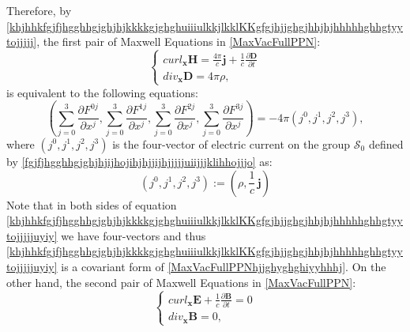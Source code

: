 \documentclass{article}
\theoremstyle{definition}
\theoremstyle{remark}
\renewcommand{\vec}[1]{\mathbf{#1}}
\newcommand{\er}{\eqref}
\newcommand{\er}{\eqref}
\begin{document}
Therefore, by
\er{khjhhkfgjfjhgghhgjghjhjkkkkgjghghuiiiulkkjlkklKKgfgjhjjghgjhhjhjhhhhhghhgtyytojjjjj},
the first pair of Maxwell Equations in \er{MaxVacFullPPN}:
\begin{equation}\label{MaxVacFullPPNhjjghyghghiyyhhhj}
\begin{cases}
curl_{\vec x} \vec H=\frac{4\pi}{c}\vec j+\frac{1}{c}\frac{\partial \vec D}{\partial t}\\
div_{\vec x} \vec D= 4\pi\rho,
\end{cases}
\end{equation}
is equivalent to the following equations:
\begin{equation}\label{khjhhkfgjfjhgghhgjghjhjkkkkgjghghuiiiulkkjlkklKKgfgjhjjghgjhhjhjhhhhhghhgtyytojjjjjuyiy}
\left(\sum_{j=0}^{3}\frac{\partial F^{0j}}{\partial
x^j},\sum_{j=0}^{3}\frac{\partial F^{1j}}{\partial
x^j},\sum_{j=0}^{3}\frac{\partial F^{2j}}{\partial
x^j},\sum_{j=0}^{3}\frac{\partial F^{3j}}{\partial
x^j}\right)
=-4\pi(j^0,j^1,j^2,j^3),
\end{equation}
where $(j^0,j^1,j^2,j^3)$ is the four-vector of electric current on
the group $\mathcal{S}_0$ defined by
\er{fgjfjhgghhgjghjhjijhojihjhjjijhjjjjjuiijjjklihhojjjo} as:
\begin{equation}
\label{fgjfjhgghhgjghjhjijhojihjhjjijhjjjjjuiijjjklihhojjjoouuoiuiu}
(j^0,j^1,j^2,j^3):=\left(\rho,\frac{1}{c}\,\vec j\right)
\end{equation}
Note that in both sides of equation
\er{khjhhkfgjfjhgghhgjghjhjkkkkgjghghuiiiulkkjlkklKKgfgjhjjghgjhhjhjhhhhhghhgtyytojjjjjuyiy}
we have four-vectors and thus
\er{khjhhkfgjfjhgghhgjghjhjkkkkgjghghuiiiulkkjlkklKKgfgjhjjghgjhhjhjhhhhhghhgtyytojjjjjuyiy}
is a covariant form of \er{MaxVacFullPPNhjjghyghghiyyhhhj}. On the
other hand, the second pair of Maxwell Equations in
\er{MaxVacFullPPN}:
\begin{equation}\label{MaxVacFullPPNhjjghyghghiyy}
\begin{cases}
curl_{\vec x} \vec E+\frac{1}{c}\frac{\partial \vec B}{\partial t}=0\\
div_{\vec x} \vec B=0,
\end{cases}
\end{equation}
\end{document}
